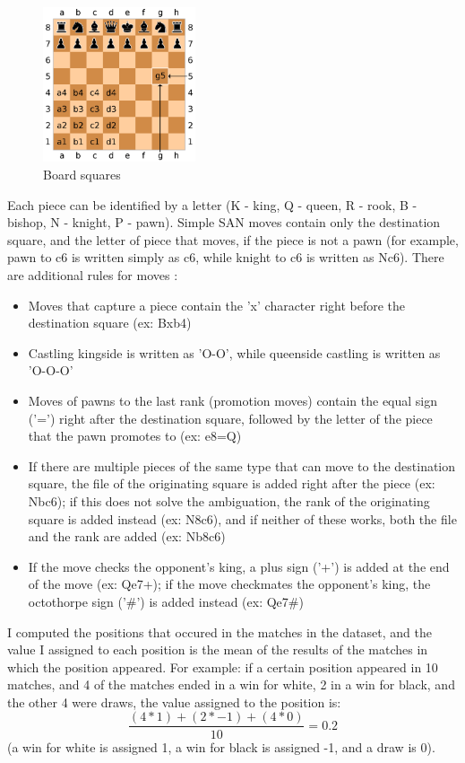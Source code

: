 \begin{figure}[h]
    \centering
    \includegraphics[width=0.4\textwidth]{figures/board-squares.png}
    \caption{Board squares}
    \label{fig:boardSquares}
\end{figure}

Each piece can be identified by a letter (K - king, Q - queen, R - rook, B - bishop, N - knight, P - pawn). Simple SAN moves contain only the destination square, and the letter of piece that moves, if the piece is not a pawn (for example, pawn to c6 is written simply as c6, while knight to c6 is written as Nc6). There are additional rules for moves \cite{edwards1994standard}:
\begin{itemize}
    \item Moves that capture a piece contain the 'x' character right before the destination square (ex: Bxb4)
    \item Castling kingside is written as 'O-O', while queenside castling is written as 'O-O-O'
    \item Moves of pawns to the last rank (promotion moves) contain the equal sign ('=') right after the destination square, followed by the letter of the piece that the pawn promotes to (ex: e8=Q)
    \item If there are multiple pieces of the same type that can move to the destination square, the file of the originating square is added right after the piece (ex: Nbc6); if this does not solve the ambiguation, the rank of the originating square is added instead (ex: N8c6), and if neither of these works, both the file and the rank are added (ex: Nb8c6)
    \item If the move checks the opponent's king, a plus sign ('+') is added at the end of the move (ex: Qe7+); if the move checkmates the opponent's king, the octothorpe sign ('\#') is added instead (ex: Qe7\#)
\end{itemize}

I computed the positions that occured in the matches in the dataset, and the value I assigned to each position is the mean of the results of the matches in which the position appeared. For example: if a certain position appeared in 10 matches, and 4 of the matches ended in a win for white, 2 in a win for black, and the other 4 were draws, the value assigned to the position is: \[\frac{(4*1)+(2*-1)+(4*0)}{10}=0.2\] (a win for white is assigned 1, a win for black is assigned -1, and a draw is 0).

